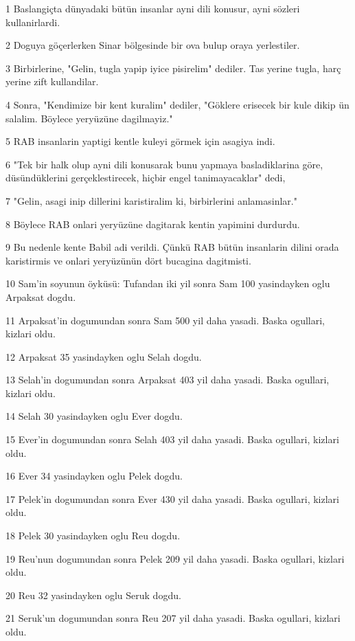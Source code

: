 \par 1 Baslangiçta dünyadaki bütün insanlar ayni dili konusur, ayni sözleri kullanirlardi.
\par 2 Doguya göçerlerken Sinar bölgesinde bir ova bulup oraya yerlestiler.
\par 3 Birbirlerine, "Gelin, tugla yapip iyice pisirelim" dediler. Tas yerine tugla, harç yerine zift kullandilar.
\par 4 Sonra, "Kendimize bir kent kuralim" dediler, "Göklere erisecek bir kule dikip ün salalim. Böylece yeryüzüne dagilmayiz."
\par 5 RAB insanlarin yaptigi kentle kuleyi görmek için asagiya indi.
\par 6 "Tek bir halk olup ayni dili konusarak bunu yapmaya basladiklarina göre, düsündüklerini gerçeklestirecek, hiçbir engel tanimayacaklar" dedi,
\par 7 "Gelin, asagi inip dillerini karistiralim ki, birbirlerini anlamasinlar."
\par 8 Böylece RAB onlari yeryüzüne dagitarak kentin yapimini durdurdu.
\par 9 Bu nedenle kente Babil adi verildi. Çünkü RAB bütün insanlarin dilini orada karistirmis ve onlari yeryüzünün dört bucagina dagitmisti.
\par 10 Sam'in soyunun öyküsü: Tufandan iki yil sonra Sam 100 yasindayken oglu Arpaksat dogdu.
\par 11 Arpaksat'in dogumundan sonra Sam 500 yil daha yasadi. Baska ogullari, kizlari oldu.
\par 12 Arpaksat 35 yasindayken oglu Selah dogdu.
\par 13 Selah'in dogumundan sonra Arpaksat 403 yil daha yasadi. Baska ogullari, kizlari oldu.
\par 14 Selah 30 yasindayken oglu Ever dogdu.
\par 15 Ever'in dogumundan sonra Selah 403 yil daha yasadi. Baska ogullari, kizlari oldu.
\par 16 Ever 34 yasindayken oglu Pelek dogdu.
\par 17 Pelek'in dogumundan sonra Ever 430 yil daha yasadi. Baska ogullari, kizlari oldu.
\par 18 Pelek 30 yasindayken oglu Reu dogdu.
\par 19 Reu'nun dogumundan sonra Pelek 209 yil daha yasadi. Baska ogullari, kizlari oldu.
\par 20 Reu 32 yasindayken oglu Seruk dogdu.
\par 21 Seruk'un dogumundan sonra Reu 207 yil daha yasadi. Baska ogullari, kizlari oldu.
